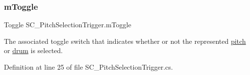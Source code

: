 \subsubsection{\texorpdfstring{m\+Toggle}{mToggle}}
{\footnotesize\ttfamily Toggle S\+C\+\_\+\+Pitch\+Selection\+Trigger.\+m\+Toggle\hspace{0.3cm}{\ttfamily [private]}}



The associated toggle switch that indicates whether or not the represented \hyperlink{group___music_enums_ga508f69b199ea518f935486c990edac1d}{pitch} or \hyperlink{group___music_enums_gade475b4382c7066d1af13e7c13c029b6}{drum} is selected. 



Definition at line 25 of file S\+C\+\_\+\+Pitch\+Selection\+Trigger.\+cs.

